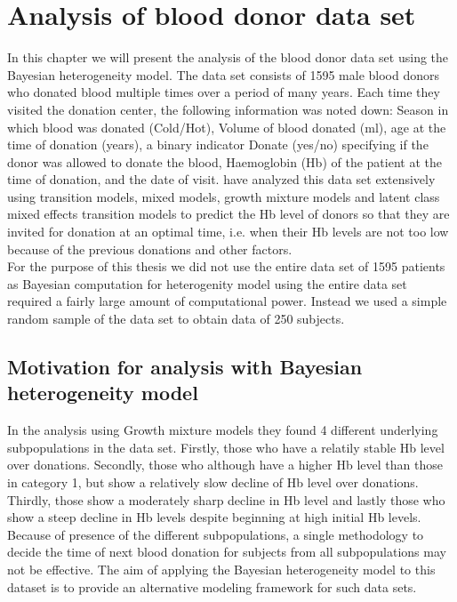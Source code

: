 
\chapter{Analysis of blood donor data set}
\label{ch : blood_donor}
 
 In this chapter we will present the analysis of the blood donor data set \citep{nasserinejad_prevalence_2015} using the Bayesian heterogeneity model. The data set consists of 1595 male blood donors who donated blood multiple times over a period of many years. Each time they visited the donation center, the following information was noted down: Season in which blood was donated (Cold/Hot), Volume of blood donated (ml), age at the time of donation (years), a binary indicator Donate (yes/no) specifying if the donor was allowed to donate the blood, Haemoglobin (Hb) of the patient at the time of donation, and the date of visit. \citet{nasserinejad_predicting_2013,nasserinejad_prevalence_2015,nasserinejad_prediction_2016} have analyzed this data set extensively using transition models, mixed models, growth mixture models and latent class mixed effects transition models to predict the Hb level of donors so that they are invited for donation at an optimal time, i.e. when their Hb levels are not too low because of the previous donations and other factors.\\

 For the purpose of this thesis we did not use the entire data set of 1595 patients as Bayesian computation for heterogenity model using the entire data set required a fairly large amount of computational power. Instead we used a simple random sample of the data set to obtain data of 250 subjects.

\section{Motivation for analysis with Bayesian heterogeneity model}
 In the analysis using Growth mixture models they found 4 different underlying subpopulations in the data set. Firstly, those who have a relatily stable Hb level over donations. Secondly, those who although have a higher Hb level than those in category 1, but show a relatively slow decline of Hb level over donations. Thirdly, those show a moderately sharp decline in Hb level and lastly those who show a steep decline in Hb levels despite beginning at high initial Hb levels. Because of presence of the different subpopulations, a single methodology to decide the time of next blood donation for subjects from all subpopulations may not be effective. The aim of applying the Bayesian heterogeneity model to this dataset is to provide an alternative modeling framework for such data sets.


